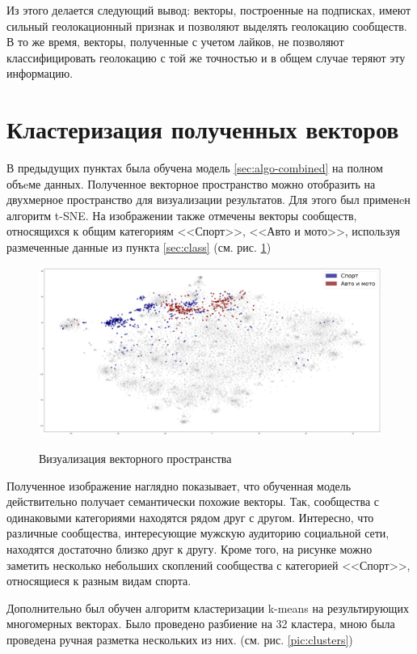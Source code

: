 \documentclass[times,specification,annotation]{itmo-student-thesis}
\begin{document}
Из этого делается следующий вывод: векторы, построенные на подписках, имеют сильный геолокационный признак и позволяют выделять геолокацию сообществ. В то же время, векторы, полученные с учетом лайков, не позволяют классифицировать геолокацию с той же точностью и в общем случае теряют эту информацию.   

\section{Кластеризация полученных векторов}\label{sec:visual}

В предыдущих пунктах была обучена модель \ref{sec:algo-combined} на полном объeме данных. Полученное векторное пространство можно отобразить на двухмерное пространство для визуализации результатов. Для этого был применeн алгоритм t-SNE. На изображении также отмечены векторы сообществ, относящихся к общим категориям <<Спорт>>, <<Авто и мото>>, используя размеченные данные из пункта \ref{sec:class} (см. рис. \ref{pic:categories})

\begin{figure}[h]
\caption{Визуализация векторного пространства}
\centering
\includegraphics[width=1\textwidth]{index0}
\label{pic:categories}
\end{figure}

Полученное изображение наглядно показывает, что обученная модель действительно получает семантически похожие векторы. Так, сообщества с одинаковыми категориями находятся рядом друг с другом. Интересно, что различные сообщества, интересующие мужскую аудиторию социальной сети, находятся достаточно близко друг к другу. Кроме того, на рисунке можно заметить несколько небольших скоплений сообщества с категорией <<Спорт>>, относящиеся к разным видам спорта.  

Дополнительно был обучен алгоритм кластеризации k-means на результирующих многомерных векторах. Было проведено разбиение на 32 кластера, мною была проведена ручная разметка нескольких из них. (см. рис. \ref{pic:clusters})
\end{document}
